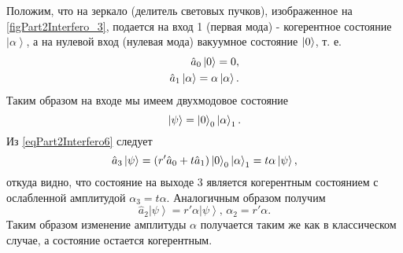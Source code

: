 

Положим, что на зеркало (делитель световых пучков), изображенное на
\autoref{figPart2Interfero_3}, подается на вход 1 (первая мода) -
когерентное состояние $\left|\alpha\right>$, а на нулевой вход
(нулевая мода) вакуумное состояние $\ket{0}$, т. е.
\begin{eqnarray}
\hat{a}_0 \ket{0} = 0,
\nonumber \\
\hat{a}_1 \left|\alpha\right> = \alpha \left|\alpha\right>.
\nonumber
\end{eqnarray}
Таким образом на входе мы имеем двухмодовое состояние 
\[
\left|\psi\right> = \ket{0}_0 \left|\alpha\right>_1.
\]
Из \eqref{eqPart2Interfero6} следует 
\begin{equation}
\hat{a}_3\left|\psi\right> = 
\left(r' \hat{a}_0 + t \hat{a}_1\right)\ket{0}_0
\left|\alpha\right>_1 = 
t \alpha \left|\psi\right>,
\nonumber
\end{equation}
откуда видно, что состояние на выходе 3 является когерентным состоянием
с ослабленной амплитудой $\alpha_3 = t \alpha$. 
Аналогичным образом получим
\begin{equation}
\hat{a}_2\left|\psi\right> = 
r' \alpha \left|\psi\right>, \, \alpha_2 = r'\alpha.
\label{eqPart2InterferoTask3}
\end{equation}
Таким образом изменение амплитуды $\alpha$ получается таким же как в
классическом случае, а состояние остается когерентным.

